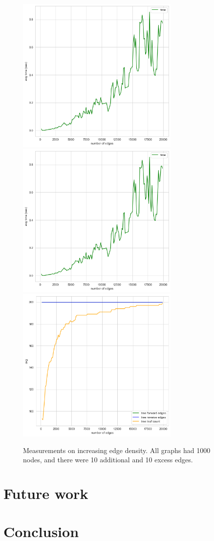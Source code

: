 \documentclass{article}
\begin{document}
\begin{landscape}
\begin{figure}
  \includegraphics[width=8cm]{figures/random_uj/edge_time.png}
  \hspace{1cm}
  \includegraphics[width=8cm]{figures/random_uj/edge_time.png}
  \hspace{1cm}
  \includegraphics[width=8cm]{figures/random_uj/edge_tree.png}

  \caption{Measurements on increasing edge density. All graphs had 1000 nodes, and there were 10 additional and 10 excess edges.}
  \label{fig:edge-density}
\end{figure}
\end{landscape}

\restoregeometry

\section{Future work}
\label{sec:future-work}



\section{Conclusion}




\end{document}
